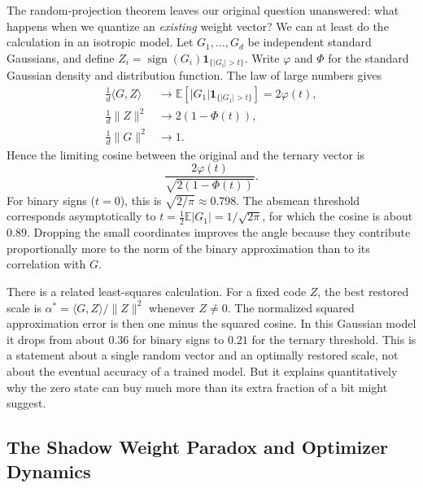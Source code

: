 The random-projection theorem leaves our original question unanswered: what happens when we quantize an \emph{existing} weight vector? We can at least do the calculation in an isotropic model. Let $G_1,\ldots,G_d$ be independent standard Gaussians, and define $Z_i=\operatorname{sign}(G_i)\mathbf 1_{\{|G_i|>t\}}$. Write $\varphi$ and $\Phi$ for the standard Gaussian density and distribution function. The law of large numbers gives
\[
 \begin{aligned}
 \frac1d\langle G,Z\rangle &\longrightarrow
   \mathbb E[|G_1|\mathbf 1_{\{|G_1|>t\}}]=2\varphi(t),\\
 \frac1d\|Z\|^2 &\longrightarrow 2(1-\Phi(t)),\\
 \frac1d\|G\|^2 &\longrightarrow 1.
 \end{aligned}
\]
Hence the limiting cosine between the original and the ternary vector is
\[
   \frac{2\varphi(t)}{\sqrt{2(1-\Phi(t))}}.
\]
For binary signs ($t=0$), this is $\sqrt{2/\pi}\approx0.798$. The absmean threshold corresponds asymptotically to $t=\tfrac12\mathbb E|G_1|=1/\sqrt{2\pi}$, for which the cosine is about $0.89$. Dropping the small coordinates improves the angle because they contribute proportionally more to the norm of the binary approximation than to its correlation with $G$.

There is a related least-squares calculation. For a fixed code $Z$, the best restored scale is $\alpha^*=\langle G,Z\rangle/\|Z\|^2$ whenever $Z\ne0$. The normalized squared approximation error is then one minus the squared cosine. In this Gaussian model it drops from about $0.36$ for binary signs to $0.21$ for the ternary threshold. This is a statement about a single random vector and an optimally restored scale, not about the eventual accuracy of a trained model. But it explains quantitatively why the zero state can buy much more than its extra fraction of a bit might suggest.

\subsection{The Shadow Weight Paradox and Optimizer Dynamics}

